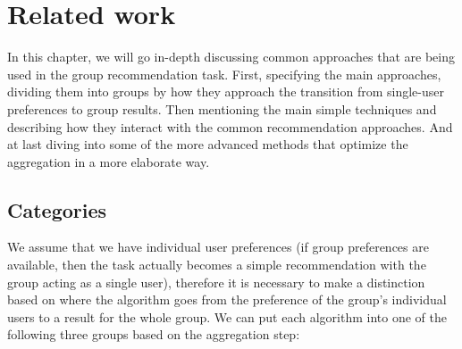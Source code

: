 \chapter{Related work} \label{chap:related_work}
In this chapter, we will go in-depth discussing common approaches that are being used in the group recommendation task. First, specifying the main approaches, dividing them into groups by how they approach the transition from single-user preferences to group results. Then mentioning the main simple techniques and describing how they interact with the common recommendation approaches. And at last diving into some of the more advanced methods that optimize the aggregation in a more elaborate way.

\section{Categories} \label{sec:03_categories}
We assume that we have individual user preferences (if group preferences are available, then the task actually becomes a simple recommendation with the group acting as a single user), therefore it is necessary to make a distinction based on where the algorithm goes from the preference of the group's individual users to a result for the whole group. We can put each algorithm into one of the following three groups based on the aggregation step:
